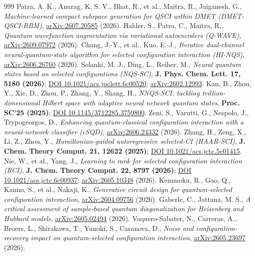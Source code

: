 \documentclass[onecolumn,a4paper]{quantumarticle}
\begin{document}
\begin{thebibliography}{999}
 Patra, A. K., Anurag, K. S. V., Bhat, R., et al., Maitra, R., Jaiganesh, G., \emph{Machine-learned compact subspace generation for QSCI within DMET (DMET-QSCI-RBM)}, \href{https://arxiv.org/abs/2607.20585}{arXiv:2607.20585} (2026).
 Halder, S., Patra, C., Maitra, R., \emph{Quantum wavefunction augmentation via variational autoencoders (Q-WAVE)}, \href{https://arxiv.org/abs/2609.07972}{arXiv:2609.07972} (2026).
 Chang, J.-Y., et al., Kuo, E.-J., \emph{Iterative dual-channel neural-quantum-state algorithm for selected configuration interaction (HI-NQS)}, \href{https://arxiv.org/abs/2606.26760}{arXiv:2606.26760} (2026).
 Solanki, M. J., Ding, L., Reiher, M., \emph{Neural quantum states based on selected configurations (NQS-SC)}, \textbf{J. Phys. Chem. Lett. 17, 5180 (2026)}; \href{https://doi.org/10.1021/acs.jpclett.6c00520}{DOI 10.1021/acs.jpclett.6c00520}; \href{https://arxiv.org/abs/2602.12993}{arXiv:2602.12993}.
 Kan, B., Zhou, Y., Xie, D., Zhou, P., Zhang, Y., Shang, H., \emph{NNQS-SCI: tackling trillion-dimensional Hilbert space with adaptive neural network quantum states}, \textbf{Proc. SC'25 (2025)}; \href{https://doi.org/10.1145/3712285.3759800}{DOI 10.1145/3712285.3759800}.
 Zeni, S., Varutti, G., Nespolo, J., Trypogeorgos, D., \emph{Enhancing quantum-classical configuration interaction with a neural-network classifier (cSQD)}, \href{https://arxiv.org/abs/2606.24332}{arXiv:2606.24332} (2026).
 Zhang, H., Zeng, X., Li, Z., Zhou, Y., \emph{Hamiltonian-guided autoregressive selected-CI (HAAR-SCI)}, \textbf{J. Chem. Theory Comput. 21, 12622 (2025)}; \href{https://doi.org/10.1021/acs.jctc.5c01415}{DOI 10.1021/acs.jctc.5c01415}.
 Nie, W., et al., Yang, J., \emph{Learning to rank for selected configuration interaction (RCI)}, \textbf{J. Chem. Theory Comput. 22, 8797 (2026)}; \href{https://doi.org/10.1021/acs.jctc.6c00937}{DOI 10.1021/acs.jctc.6c00937}; \href{https://arxiv.org/abs/2605.10348}{arXiv:2605.10348} (2026).
 Kemmoku, R., Gao, Q., Kanno, S., et al., Nakaji, K., \emph{Generative circuit design for quantum-selected configuration interaction}, \href{https://arxiv.org/abs/2604.09756}{arXiv:2604.09756} (2026).
 Gaberle, C., Jattana, M. S., \emph{A critical assessment of sample-based quantum diagonalization for Heisenberg and Hubbard models}, \href{https://arxiv.org/abs/2605.02494}{arXiv:2605.02494} (2026).
 Vaquero-Sabater, N., Carreras, A., Broers, L., Shirakawa, T., Yunoki, S., Casanova, D., \emph{Noise and configuration-recovery impact on quantum-selected configuration interaction}, \href{https://arxiv.org/abs/2605.23697}{arXiv:2605.23697} (2026).

\end{thebibliography}
\end{document}
